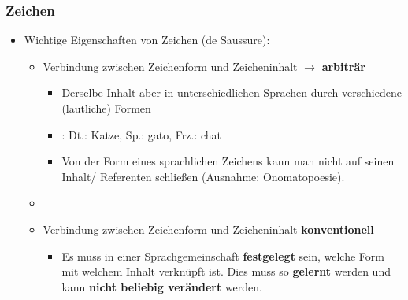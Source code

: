 \begin{frame}
\frametitle{Zeichen}

\begin{itemize}
	\item Wichtige Eigenschaften von Zeichen (de Saussure):
	
	\begin{itemize}
		\item Verbindung zwischen Zeichenform und Zeicheninhalt $\rightarrow$ \textbf{arbiträr}
		
		\begin{itemize}
			\item Derselbe Inhalt aber in unterschiedlichen Sprachen durch verschiedene (lautliche) Formen
			\item {}: Dt.: Katze, Sp.: gato, Frz.: chat
			\item Von der Form eines sprachlichen Zeichens kann man nicht auf seinen Inhalt/ Referenten schließen (Ausnahme: Onomatopoesie).
		\end{itemize}
		
		\item []		
		\item Verbindung zwischen Zeichenform und Zeicheninhalt \ras \textbf{konventionell}
		
		\begin{itemize}
			\item Es muss in einer Sprachgemeinschaft \textbf{festgelegt} sein, welche Form mit welchem Inhalt verknüpft ist. Dies muss so \textbf{gelernt} werden und kann \textbf{nicht beliebig verändert} werden.
		\end{itemize}
		
	\end{itemize}
	
\end{itemize}

\end{frame}



